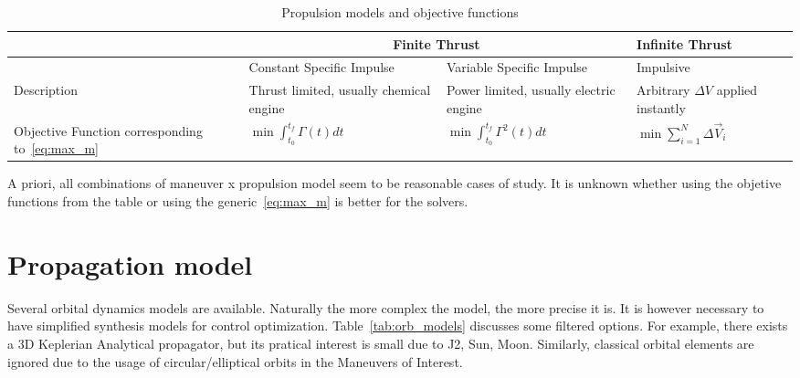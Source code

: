 \begin{table}[htpb]
    \centering
    \begin{tabular}{p{3.2cm}p{3.2cm}p{3.2cm}p{3.2cm}} \toprule
        & \multicolumn{2}{c}{\textbf{Finite Thrust}} & \textbf{Infinite Thrust} \\ \midrule
        & Constant Specific Impulse & Variable Specific Impulse & Impulsive \\ \midrule
        Description & Thrust limited, usually chemical engine & Power limited, usually electric engine & Arbitrary \(\Delta V\) applied instantly \\
        Objective Function corresponding to~\eqref{eq:max_m} & \(\min \int_{t_0}^{t_f} \Gamma(t) dt\) & \(\min \int_{t_0}^{t_f} \Gamma^2(t) dt\) & \(\min \sum_{i=1}^N \Delta \vec{V}_i\) \\ \bottomrule
    \end{tabular}
    \caption{Propulsion models and objective functions}\label{tab:prop_models}
\end{table}

A priori, all combinations of maneuver x propulsion model seem to be reasonable cases of study. It is unknown whether using the objetive functions from the table or using the generic~\eqref{eq:max_m} is better for the solvers.

\newpage
\section{Propagation model}

Several orbital dynamics models are available. Naturally the more complex the model, the more precise it is. It is however necessary to have simplified synthesis models for control optimization. Table~\ref{tab:orb_models} discusses some filtered options. For example, there exists a 3D Keplerian Analytical propagator, but its pratical interest is small due to J2, Sun, Moon. Similarly, classical orbital elements are ignored due to the usage of circular/elliptical orbits in the Maneuvers of Interest.


